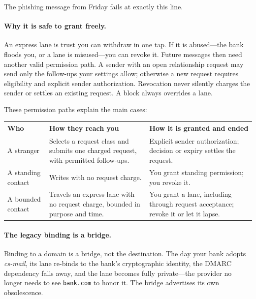 \documentclass[11pt]{article}
\begin{document}
The phishing message from Friday fails at exactly this line.

\paragraph{Why it is safe to grant freely.}
An express lane is trust you can withdraw in one tap. If it is abused---the bank
floods you, or a lane is misused---you can revoke it. Future messages then need
another valid permission path. A sender with an open relationship request may
send only the follow-ups your settings allow; otherwise a new request requires
eligibility and explicit sender authorization. Revocation never silently charges
the sender or settles an existing request. A block always overrides a lane.

\medskip

These permission paths explain the main cases:

\begin{center}
\small
\begin{tabular}{@{}>{\raggedright\arraybackslash}p{}>{\raggedright\arraybackslash}p{}>{\raggedright\arraybackslash}p{}@{}}
\toprule
\textbf{Who} & \textbf{How they reach you} & \textbf{How it is granted and ended}
\\
\midrule
A stranger & Selects a request class and submits one charged request, with permitted
follow-ups. & Explicit sender authorization; decision or expiry settles the request. \\
A standing contact & Writes with no request charge. & You grant standing permission; you
revoke it. \\
A bounded contact & Travels an express lane with no request charge, bounded in purpose
and time. & You grant a lane, including through request acceptance; revoke it or let it
lapse. \\
\bottomrule
\end{tabular}
\end{center}

\paragraph{The legacy binding is a bridge.}
Binding to a domain is a bridge, not the destination. The day your bank adopts
\textit{cs-mail}, its lane re-binds to the bank's cryptographic identity, the
DMARC dependency falls away, and the lane becomes fully private---the provider no
longer needs to see \texttt{bank.com} to honor it. The bridge advertises its own
obsolescence.
\end{document}
